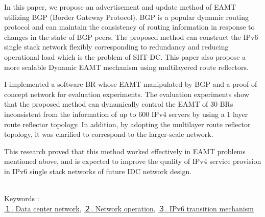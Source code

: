 In this paper, we propose an advertisement and update method of EAMT utilizing BGP (Border Gateway Protocol). BGP is a popular dynamic routing protocol and can maintain the consistency of routing information in response to changes in the state of BGP peers.
The proposed method can construct the IPv6 single stack network flexibly corresponding to redundancy and reducing operational load which is the problem of SIIT-DC. This paper also propose a more scalable Dynamic EAMT mechanism using multilayered route reflectors.

I implemented a software BR whose EAMT manipulated by BGP and a proof-of-concept network for evaluation experiments. 
The evaluation experiments show that the proposed method can dynamically control the EAMT of 30 BRs inconsistent from the information of up to 600 IPv4 servers by using a 1 layer route reflector topology. In addition, by adopting the multilayer route reflector topology, it was clarified to correspond to the larger-scale network.

This research proved that this method worked effectively in EAMT problems mentioned above, and is expected to improve the quality of IPv4 service provision in IPv6 single stack networks of future IDC network design.

~\\ 

Keywords : \\
\underline{１. Data center network},
\underline{２. Network operation},
\underline{３. IPv6 transition mechanism}
\begin{flushright}
\edept \\
\eauthor
\end{flushright}
